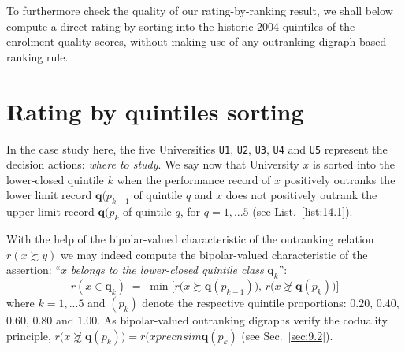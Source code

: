 To furthermore check the quality of our \Copeland rating-by-ranking result, we shall below compute a direct rating-by-sorting into the historic 2004 quintiles of the enrolment quality scores, without making use of any outranking digraph based ranking rule.

\section{Rating by quintiles sorting}
\label{sec:14.4}

In the case study here, the five Universities \texttt{U1}, \texttt{U2}, \texttt{U3}, \texttt{U4} and \texttt{U5} represent the decision actions: \emph{where to study}. We say now that University $x$ is sorted into the lower-closed quintile $k$ when the performance record of $x$ positively outranks the lower limit record $\mathbf{q}(p_{k-1}$ of quintile $q$ and $x$ does not positively outrank the upper limit record $\mathbf{q}(p_{k}$ of quintile $q$, for $q = 1,...5$ (see List.~\vref{list:14.1}).

With the help of the bipolar-valued characteristic of the outranking relation $r(x \succsim y)$ we may indeed compute the bipolar-valued characteristic of the assertion: ``$x$ \emph{belongs to the lower-closed quintile class} $\mathbf{q}_k$'':
\begin{equation}\label{eq:14.1}
r(x \in \mathbf{q}_k) \; = \; \min \big[ r\big(x \succsim \mathbf{q}(p_{k-1})\big),\, r\big(x \not\succsim \mathbf{q}(p_{k})\big)\big]
\end{equation}
where $k = 1,...5$ and $(p_{k})$ denote the respective quintile proportions: $0.20$, $0.40$, $0.60$, $0.80$ and $1.00$. As bipolar-valued outranking digraphs verify the coduality principle, $r\big(x \not\succsim \mathbf{q}(p_{k}) \big) = r\big(x precnsim \mathbf{q}(p_{k})$ (see Sec.~\ref{sec:9.2}).

